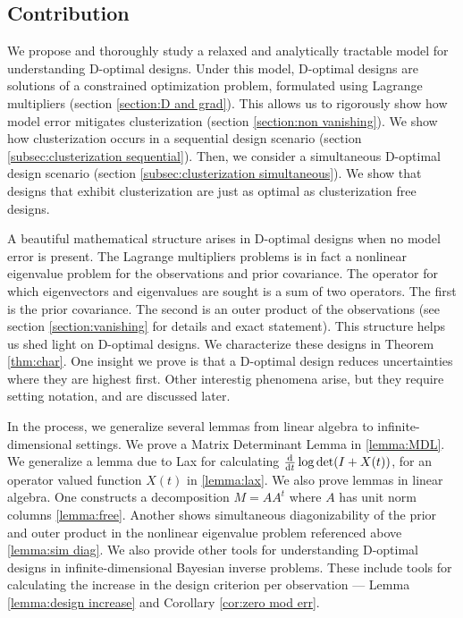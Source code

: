 \documentclass{amsart}
\numberwithin{equation}{section}
\begin{document}
\subsection{Contribution}
We propose and thoroughly study a relaxed and analytically tractable
model for understanding D-optimal designs. Under this model, D-optimal
designs are solutions of a constrained optimization problem,
formulated using Lagrange multipliers (section \ref{section:D and
  grad}). This allows us to rigorously show how model error mitigates
clusterization (section \ref{section:non vanishing}). We show how
clusterization occurs in a sequential design scenario (section
\ref{subsec:clusterization sequential}). Then, we consider a
simultaneous D-optimal design scenario (section
\ref{subsec:clusterization simultaneous}). We show that designs that
exhibit clusterization are just as optimal as clusterization free
designs.

A beautiful mathematical structure arises in D-optimal designs when no
model error is present. The Lagrange multipliers problems is in fact a
nonlinear eigenvalue problem for the observations and prior
covariance. The operator for which eigenvectors and eigenvalues are
sought is a sum of two operators. The first is the prior
covariance. The second is an outer product of the observations (see
section \ref{section:vanishing} for details and exact statement). This
structure helps us shed light on D-optimal designs. We characterize
these designs in Theorem \ref{thm:char}. One insight we prove is that
a D-optimal design reduces uncertainties where they are highest
first. Other interestig phenomena arise, but they require setting
notation, and are discussed later.

In the process, we generalize several lemmas from linear algebra to
infinite-dimensional settings. We prove a Matrix Determinant Lemma in
\ref{lemma:MDL}. We generalize a lemma due to Lax \cite{lax97} for
calculating $\frac{\text{\textup{d}}}{\text{\textup{d}} t} \log \det (I + X(t))$, for an
operator valued function $X(t)$ in \ref{lemma:lax}. We also prove
lemmas in linear algebra. One constructs a decomposition $M = AA^t$
where $A$ has unit norm columns \ref{lemma:free}. Another shows
simultaneous diagonizability of the prior and outer product in the
nonlinear eigenvalue problem referenced above \ref{lemma:sim diag}. We
also provide other tools for understanding D-optimal designs in
infinite-dimensional Bayesian inverse problems. These include tools
for calculating the increase in the design criterion per observation
--- Lemma \ref{lemma:design increase} and Corollary \ref{cor:zero mod
  err}.
\end{document}
